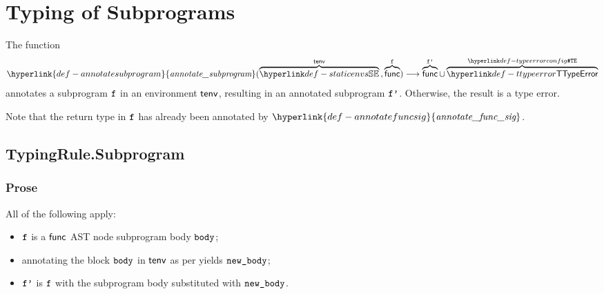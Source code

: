 \documentclass{book}
\newcommand\ProseOtherwiseTypeError[0]{Otherwise, the result is a type error.}
\newcommand\ProseOrTypeError[0]{\ProseTerminateAs{\TypeErrorConfig}}
\newcommand\annotatefuncsig[0]{\hyperlink{def-annotatefuncsig}{\textfunc{annotate\_func\_sig}}}
\newcommand\annotatesubprogram[1]{\hyperlink{def-annotatesubprogram}{\textfunc{annotate\_subprogram}}(#1)}
\begin{document}
\chapter{Typing of Subprograms \label{chap:TypingSubprograms}}
\hypertarget{def-annotatesubprogram}{}
The function
\[
  \annotatesubprogram{\overname{\staticenvs}{\tenv} \aslsep \overname{\func}{\vf}} \aslto \overname{\func}{\vfp}
  \cup \overname{\TTypeError}{\TypeErrorConfig}
\]
annotates a subprogram $\texttt{f}$ in an environment $\textsf{tenv}$, resulting in an annotated subprogram $\texttt{f'}$.
\ProseOtherwiseTypeError

Note that the return type in $\texttt{f}$ has already been annotated by $\annotatefuncsig$.

\section{TypingRule.Subprogram \label{sec:TypingRule.Subprogram}}

\subsection{Prose}
All of the following apply:
\begin{itemize}
  \item $\texttt{f}$ is a $\textsf{func}$ AST node subprogram body $\texttt{body}$;
  \item annotating the block $\texttt{body}$ in $\textsf{tenv}$ as per  yields $\texttt{new\_body}$\ProseOrTypeError;
  \item $\texttt{f'}$ is $\texttt{f}$ with the subprogram body substituted with $\texttt{new\_body}$.
\end{itemize}

\end{document}
